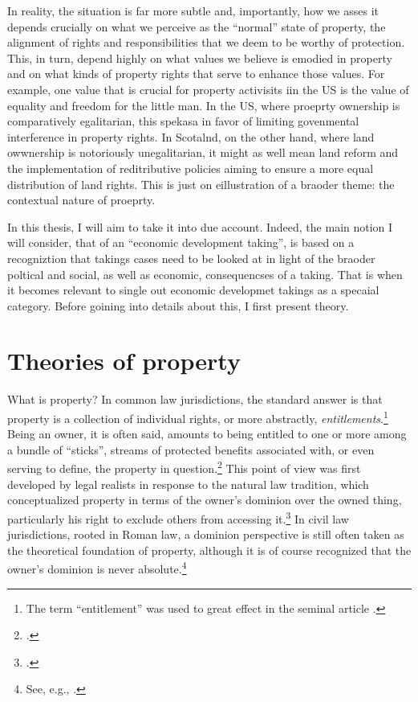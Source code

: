 In reality, the situation is far more subtle and, importantly, how we asses it depends crucially on what we perceive as the ``normal'' state of property, the alignment of rights and responsibilities that we deem to be worthy of protection. This, in turn, depend highly on what values we believe is emodied in property and on what kinds of property rights that serve to enhance those values. For example, one value that is crucial for property activisits iin the US is the value of equality and freedom for the little man. In the US, where proeprty ownership is comparatively egalitarian, this spekasa in favor of limiting govenmental interference in property rights. In Scotalnd, on the other hand, where land owwnership is notoriously unegalitarian, it might as well mean land reform and the implementation of reditributive policies aiming to ensure a more equal distribution of land rights. This is just on eillustration of a braoder theme: the contextual nature of proeprty.

In this thesis, I will aim to take it into due account. Indeed, the main notion I will consider, that of an ``economic development taking'',  is based on a recogniztion that takings cases need to be looked at in light of the braoder poltical and social, as well as economic, consequencses of a taking. That is when it becomes relevant to single out economic developmet takings as a specaial category. Before goining into details about this, I first present theory. 

\section{Theories of property}

What is property? In common law jurisdictions, the standard answer is that property is a collection of individual rights, or more abstractly, {\it entitlements}.\footnote{The term ``entitlement'' was used to great effect in the seminal article \cite{calabresi72}.} Being an owner, it is often said, amounts to being entitled to one or more among a bundle of ``sticks'', streams of protected benefits associated with, or even serving to define, the property in question.\footcite[357-358]{merrill01} This point of view was first developed by legal realists in response to the natural law tradition, which conceptualized property in terms of the owner's dominion over the owned thing, particularly his right to exclude others from accessing it.\footcite[193-195]{klein11} In civil law jurisdictions, rooted in Roman law, a dominion perspective is still often taken as the theoretical foundation of property, although it is of course recognized that the owner's dominion is never absolute.\footnote{See, e.g., \cite[?]{foster10}.}

